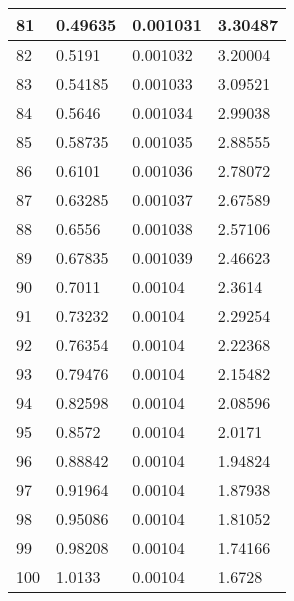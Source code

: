\documentclass[twocolumn]{article}
\begin{document}
\begin{tabular}{l|l|l|l}
81	&	0.49635	&	0.001031	&	3.30487 \\ \hline
82	&	0.5191	&	0.001032	&	3.20004 \\ \hline
83	&	0.54185	&	0.001033	&	3.09521 \\ \hline
84	&	0.5646	&	0.001034	&	2.99038 \\ \hline
85	&	0.58735	&	0.001035	&	2.88555 \\ \hline
86	&	0.6101	&	0.001036	&	2.78072 \\ \hline
87	&	0.63285	&	0.001037	&	2.67589 \\ \hline
88	&	0.6556	&	0.001038	&	2.57106 \\ \hline
89	&	0.67835	&	0.001039	&	2.46623 \\ \hline
90	&	0.7011	&	0.00104	&	2.3614 \\ \hline
91	&	0.73232	&	0.00104	&	2.29254 \\ \hline
92	&	0.76354	&	0.00104	&	2.22368 \\ \hline
93	&	0.79476	&	0.00104	&	2.15482 \\ \hline
94	&	0.82598	&	0.00104	&	2.08596 \\ \hline
95	&	0.8572	&	0.00104	&	2.0171 \\ \hline
96	&	0.88842	&	0.00104	&	1.94824 \\ \hline
97	&	0.91964	&	0.00104	&	1.87938 \\ \hline
98	&	0.95086	&	0.00104	&	1.81052 \\ \hline
99	&	0.98208	&	0.00104	&	1.74166 \\ \hline
100	&	1.0133	&	0.00104	&	1.6728 \\ \hline
\end{tabular}
\end{document}
